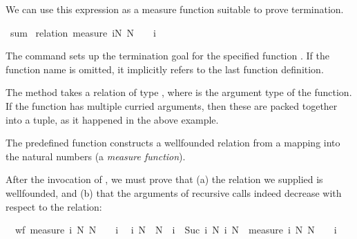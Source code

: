 \begin{isabellebody}
\begin{isamarkuptext}
  We can use this expression as a measure function suitable to prove termination.%
\end{isamarkuptext}%
\isamarkuptrue%
\isamarkupfalse%
\ sum\isanewline
%
\isadelimproof
%
\endisadelimproof
%
\isatagproof
{}\isamarkupfalse%
\ {\isacharparenleft}relation\ {\isachardoublequoteopen}measure\ {\isacharparenleft}{\isasymlambda}{\isacharparenleft}i{\isacharcomma}N{\isacharparenright}{\isachardot}\ N\ {\isacharplus}\ {}\ {\isacharminus}\ i{\isacharparenright}{\isachardoublequoteclose}{\isacharparenright}%
\begin{isamarkuptxt}%
The  command sets up the termination goal for the
  specified function . If the function name is omitted, it
  implicitly refers to the last function definition.

  The  method takes a relation of
  type , where  is the argument type of
  the function. If the function has multiple curried arguments, then
  these are packed together into a tuple, as it happened in the above
  example.

  The predefined function  constructs a
  wellfounded relation from a mapping into the natural numbers (a
  \emph{measure function}). 

  After the invocation of , we must prove that (a)
  the relation we supplied is wellfounded, and (b) that the arguments
  of recursive calls indeed decrease with respect to the
  relation:

  \begin{isabelle}%
\ {}{\isachardot}\ wf\ {\isacharparenleft}measure\ {\isacharparenleft}{\isasymlambda}{\isacharparenleft}i{\isacharcomma}\ N{\isacharparenright}{\isachardot}\ N\ {\isacharplus}\ {}\ {\isacharminus}\ i{\isacharparenright}{\isacharparenright}\isanewline
\ {}{\isachardot}\ {\isasymAnd}i\ N{\isachardot}\ {\isasymnot}\ N\ {\isacharless}\ i\ {\isasymLongrightarrow}\ {\isacharparenleft}{\isacharparenleft}Suc\ i{\isacharcomma}\ N{\isacharparenright}{\isacharcomma}\ i{\isacharcomma}\ N{\isacharparenright}\ {\isasymin}\ measure\ {\isacharparenleft}{\isasymlambda}{\isacharparenleft}i{\isacharcomma}\ N{\isacharparenright}{\isachardot}\ N\ {\isacharplus}\ {}\ {\isacharminus}\ i{\isacharparenright}%
\end{isabelle}


\end{isamarkuptxt}
\end{isabellebody}
